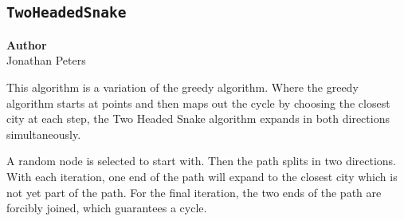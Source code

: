 \subsection{\texttt{TwoHeadedSnake}}
\label{subsec:twoheadedsnake}

\begin{flushright}
	\textbf{Author} \\
	Jonathan Peters
\end{flushright}

This algorithm is a variation of the greedy algorithm. Where the greedy algorithm starts at points and then maps out the cycle by choosing the closest city at each step, the Two Headed Snake algorithm expands in both directions simultaneously. 

A random node is selected to start with. Then the path splits in two directions. With each iteration, one end of the path will expand to the closest city which is not yet part of the path. For the final iteration, the two ends of the path are forcibly joined, which guarantees a cycle.

